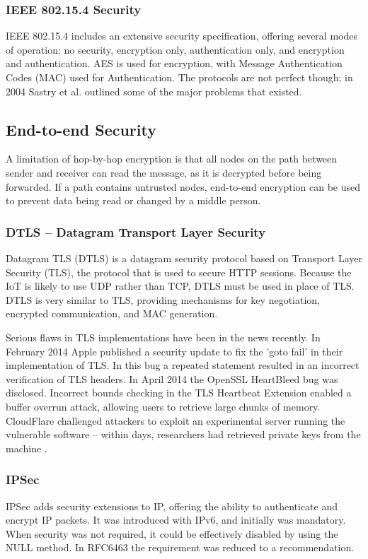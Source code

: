 \documentclass[10pt,journal,compsoc]{IEEEtran}
\begin{document}
\subsubsection{IEEE 802.15.4 Security}
IEEE 802.15.4 includes an extensive security specification, offering several
modes of operation: no security, encryption only, authentication only, and
encryption and authentication. AES is used for encryption, with Message
Authentication Codes (MAC) used for Authentication. The protocols are not
perfect though; in 2004 Sastry et al. \cite{Sastry2004} outlined some of the
major problems that existed.  


\subsection{End-to-end Security}
A limitation of hop-by-hop encryption is that all nodes on the path between
sender and receiver can read the message, as it is decrypted before being
forwarded. If a path contains untrusted nodes, end-to-end encryption can be
used to prevent data being read or changed by a middle person. 

\subsubsection{DTLS -- Datagram Transport Layer Security}
Datagram TLS (DTLS) is a datagram security protocol based on Transport Layer
Security (TLS), the protocol that is used to secure HTTP sessions. Because the
IoT is likely to use UDP rather than TCP, DTLS must be used in place of TLS.
DTLS is very similar to TLS, providing mechanisms for key negotiation,
encrypted communication, and MAC generation.  

Serious flaws in TLS implementations have been in the news recently. In
February 2014 Apple published a security update to fix the 'goto fail' in their
implementation of TLS. In this bug a repeated statement resulted in an
incorrect verification of TLS headers. In April 2014 the OpenSSL HeartBleed bug
was disclosed. Incorrect bounds checking in the TLS Heartbeat Extension enabled
a buffer overrun attack, allowing users to retrieve large chunks of memory.
CloudFlare challenged attackers to exploit an experimental server running the
vulnerable software -- within days, researchers had retrieved private keys from
the machine \cite{CloudFlare2014}.

\subsubsection{IPSec}
IPSec adds security extensions to IP, offering the ability to authenticate and
encrypt IP packets. It was introduced with IPv6, and initially was mandatory.
When security was not required, it could be effectively disabled by using the
NULL method. In RFC6463 the requirement was reduced to a recommendation. 
\end{document}
